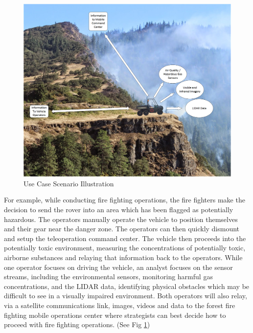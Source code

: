 \begin{figure}[H]
\centering
\includegraphics[width=0.75\linewidth]{UseCaseIllustration}
\caption{Use Case Scenario Illustration}
\label{fig:usecase}
\end{figure}
For example, while conducting fire fighting operations, the fire fighters make the decision to send the rover into an area which has been flagged as potentially hazardous. The operators manually operate the vehicle to position themselves and their gear near the danger zone. The operators can then quickly dismount and setup the teleoperation command center. The vehicle then proceeds into the potentially toxic environment, measuring the concentrations of potentially toxic, airborne substances and relaying that information back to the operators. While one operator focuses on driving the vehicle, an analyst focuses on the sensor streams, including the environmental sensors, monitoring harmful gas concentrations, and the LIDAR data, identifying physical obstacles which may be difficult to see in a visually impaired environment. Both operators will also relay, via a satellite communications link, images, videos and data to the forest fire fighting mobile operations center where strategists can best decide how to proceed with fire fighting operations. (See Fig \ref{fig:usecase})
%
